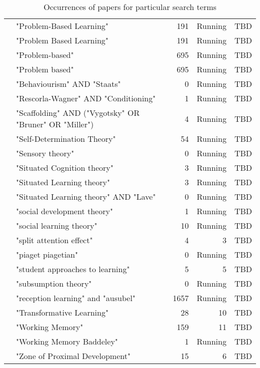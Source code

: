 \begin{table*}[t]
\begin{tabular}{lp{7cm}rrp{3cm}}
& "Problem-Based Learning" & 191 & Running & TBD \\
& "Problem Based Learning" & 191 & Running & TBD \\
& "Problem-based" & 695 & Running & TBD \\
& "Problem based" & 695 & Running & TBD \\
& "Behaviourism" AND "Staats" & 0 & Running & TBD \\
& "Rescorla-Wagner" AND "Conditioning" & 1 & Running & TBD \\
& "Scaffolding" AND ("Vygotsky" OR "Bruner" OR "Miller") & 4 & Running & TBD \\
& "Self-Determination Theory" & 54 & Running & TBD \\
& "Sensory theory" & 0 & Running & TBD \\
& "Situated Cognition theory" & 3 & Running & TBD \\
& "Situated Learning theory" & 3 & Running & TBD \\
& "Situated Learning theory" AND "Lave" & 0 & Running & TBD \\
& "social development theory" & 1 & Running & TBD \\
& "social learning theory" & 10 & Running & TBD \\
& "split attention effect" & 4 & 3 & TBD \\
& "piaget piagetian" & 0 & Running & TBD \\
& "student approaches to learning" & 5 & 5 & TBD \\
& "subsumption theory" & 0 & Running & TBD \\
& "reception learning" and "ausubel" & 1657 & Running & TBD \\
& "Transformative Learning" & 28 & 10 & TBD \\
& "Working Memory" & 159 & 11 & TBD \\
& "Working Memory Baddeley" & 1 & Running & TBD \\
& "Zone of Proximal Development" & 15 & 6 & TBD \\
\end{tabular}
\caption{Occurrences of papers for particular search terms}
\end{table*}